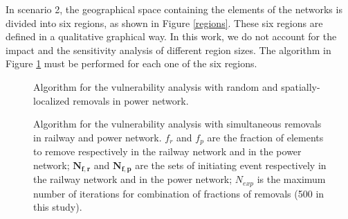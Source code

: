 \documentclass[review]{elsarticle}
\begin{document}
    In scenario 2, the geographical space containing the elements of the networks is divided into six regions, as shown in Figure \ref{regions}. These six regions are defined in a qualitative graphical way. In this work, we do not account for the impact and the sensitivity analysis of different region sizes. The algorithm in Figure \ref{algo_scenario_1} must be performed for each one of the six regions.
\begin{figure}[h]
	\centering
	\caption{Algorithm for the vulnerability analysis with random and spatially-localized removals in power network.}
	\label{algo_scenario_1}
\end{figure}
\begin{figure}[h]
	\centering
	\caption{Algorithm for the vulnerability analysis with simultaneous removals in railway and power network. $f_r$ and $f_p$ are the fraction of elements to remove respectively in the railway network and in the power network; $\mathbf{N_{f,r}}$ and $\mathbf{N_{f,p}}$ are the sets of initiating event respectively in the railway network and in the power network; $N_{exp}$ is the maximum number of iterations for combination of fractions of removals (500 in this study).}
	\label{algo_scenario_3}
\end{figure}
\end{document}
